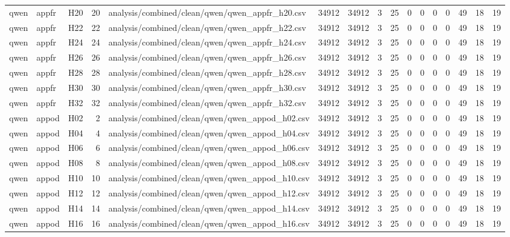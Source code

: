 \begin{longtable}{lllrlrrrrrrrrrrr}
qwen & appfr & H20 & 20 & analysis/combined/clean/qwen/qwen\_appfr\_h20.csv & 34912 & 34912 & 3 & 25 & 0 & 0 & 0 & 0 & 49 & 18 & 19 \\
qwen & appfr & H22 & 22 & analysis/combined/clean/qwen/qwen\_appfr\_h22.csv & 34912 & 34912 & 3 & 25 & 0 & 0 & 0 & 0 & 49 & 18 & 19 \\
qwen & appfr & H24 & 24 & analysis/combined/clean/qwen/qwen\_appfr\_h24.csv & 34912 & 34912 & 3 & 25 & 0 & 0 & 0 & 0 & 49 & 18 & 19 \\
qwen & appfr & H26 & 26 & analysis/combined/clean/qwen/qwen\_appfr\_h26.csv & 34912 & 34912 & 3 & 25 & 0 & 0 & 0 & 0 & 49 & 18 & 19 \\
qwen & appfr & H28 & 28 & analysis/combined/clean/qwen/qwen\_appfr\_h28.csv & 34912 & 34912 & 3 & 25 & 0 & 0 & 0 & 0 & 49 & 18 & 19 \\
qwen & appfr & H30 & 30 & analysis/combined/clean/qwen/qwen\_appfr\_h30.csv & 34912 & 34912 & 3 & 25 & 0 & 0 & 0 & 0 & 49 & 18 & 19 \\
qwen & appfr & H32 & 32 & analysis/combined/clean/qwen/qwen\_appfr\_h32.csv & 34912 & 34912 & 3 & 25 & 0 & 0 & 0 & 0 & 49 & 18 & 19 \\
qwen & appod & H02 & 2 & analysis/combined/clean/qwen/qwen\_appod\_h02.csv & 34912 & 34912 & 3 & 25 & 0 & 0 & 0 & 0 & 49 & 18 & 19 \\
qwen & appod & H04 & 4 & analysis/combined/clean/qwen/qwen\_appod\_h04.csv & 34912 & 34912 & 3 & 25 & 0 & 0 & 0 & 0 & 49 & 18 & 19 \\
qwen & appod & H06 & 6 & analysis/combined/clean/qwen/qwen\_appod\_h06.csv & 34912 & 34912 & 3 & 25 & 0 & 0 & 0 & 0 & 49 & 18 & 19 \\
qwen & appod & H08 & 8 & analysis/combined/clean/qwen/qwen\_appod\_h08.csv & 34912 & 34912 & 3 & 25 & 0 & 0 & 0 & 0 & 49 & 18 & 19 \\
qwen & appod & H10 & 10 & analysis/combined/clean/qwen/qwen\_appod\_h10.csv & 34912 & 34912 & 3 & 25 & 0 & 0 & 0 & 0 & 49 & 18 & 19 \\
qwen & appod & H12 & 12 & analysis/combined/clean/qwen/qwen\_appod\_h12.csv & 34912 & 34912 & 3 & 25 & 0 & 0 & 0 & 0 & 49 & 18 & 19 \\
qwen & appod & H14 & 14 & analysis/combined/clean/qwen/qwen\_appod\_h14.csv & 34912 & 34912 & 3 & 25 & 0 & 0 & 0 & 0 & 49 & 18 & 19 \\
qwen & appod & H16 & 16 & analysis/combined/clean/qwen/qwen\_appod\_h16.csv & 34912 & 34912 & 3 & 25 & 0 & 0 & 0 & 0 & 49 & 18 & 19 \\

\end{longtable}
